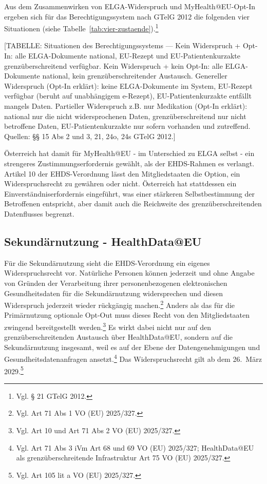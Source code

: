 Aus dem Zusammenwirken von ELGA-Widerspruch und MyHealth@EU-Opt-In
ergeben sich für das Berechtigungssystem nach GTelG 2012 die folgenden
vier Situationen (siehe Tabelle~\ref{tab:vier-zustaende}).\footnote{Vgl. § 21 GTelG 2012.}

[TABELLE: Situationen des Berechtigungssystems — Kein Widerspruch + Opt-In: alle ELGA-Dokumente national, EU-Rezept und EU-Patientenkurzakte grenzüberschreitend verfügbar. Kein Widerspruch + kein Opt-In: alle ELGA-Dokumente national, kein grenzüberschreitender Austausch. Genereller Widerspruch (Opt-In erklärt): keine ELGA-Dokumente im System, EU-Rezept verfügbar (beruht auf unabhängigem e-Rezept), EU-Patientenkurzakte entfällt mangels Daten. Partieller Widerspruch z.B. nur Medikation (Opt-In erklärt): national nur die nicht widersprochenen Daten, grenzüberschreitend nur nicht betroffene Daten, EU-Patientenkurzakte nur sofern vorhanden und zutreffend. Quellen: §§ 15 Abs 2 und 3, 21, 24o, 24s GTelG 2012.]

Österreich hat damit für MyHealth@EU - im Unterschied zu ELGA selbst - ein strengeres Zustimmungserfordernis gewählt, als der EHDS-Rahmen es verlangt. Artikel 10 der EHDS-Verordnung lässt den Mitgliedstaaten die Option, ein Widerspruchsrecht zu gewähren oder nicht. Österreich hat stattdessen ein Einverständniserfordernis eingeführt, was einer stärkeren Selbstbestimmung der Betroffenen entspricht, aber damit auch die Reichweite des grenzüberschreitenden Datenflusses begrenzt.


\subsection{Sekundärnutzung - HealthData@EU}
Für die Sekundärnutzung sieht die EHDS-Verordnung ein eigenes Widerspruchsrecht vor. Natürliche Personen können jederzeit und ohne Angabe von Gründen der Verarbeitung ihrer personenbezogenen elektronischen Gesundheitsdaten für die Sekundärnutzung widersprechen und diesen Widerspruch jederzeit wieder rückgängig machen.\footnote{Vgl. Art 71 Abs 1 VO (EU) 2025/327.} Anders als das für die Primärnutzung optionale Opt-Out muss dieses Recht von den Mitgliedstaaten zwingend bereitgestellt werden.\footnote{Vgl. Art 10 und Art 71 Abs 2 VO (EU) 2025/327.} Es wirkt dabei nicht nur auf den grenzüberschreitenden Austausch über HealthData@EU, sondern auf die Sekundärnutzung insgesamt, weil es auf der Ebene der Datengenehmigungen und Gesundheitsdatenanfragen ansetzt.\footnote{Vgl. Art 71 Abs 3 iVm Art 68 und 69 VO (EU) 2025/327; HealthData@EU als grenzüberschreitende Infrastruktur Art 75 VO (EU) 2025/327.} Das Widerspruchsrecht gilt ab dem 26.~März 2029.\footnote{Vgl. Art 105 lit a VO (EU) 2025/327.}

